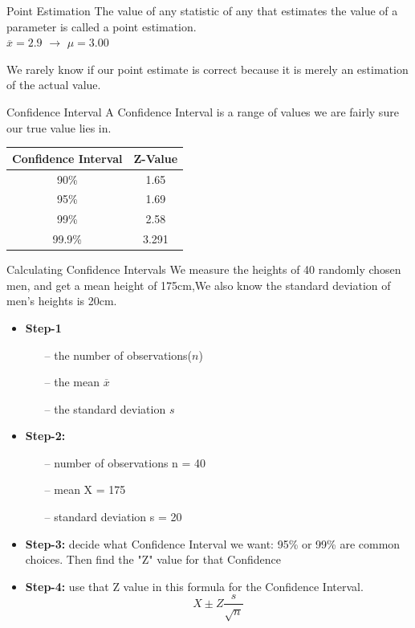 \begin{frame}[t]{Point Estimation}
	The value of any statistic of any that estimates the value of a parameter 
	is called a point estimation. \\ 
	$\overline{x} = 2.9$ $\rightarrow$ $\mu = 3.00$
	
	We rarely know if our point estimate is correct because it is merely an 
	estimation of the actual value.
\end{frame}


\begin{frame}[t]{Confidence Interval}
	A Confidence Interval is a range of values we are fairly sure our true 
	value lies in. \\ 
	\begin{center}
		\begin{tabular}{|c|c|}
			\hline 
			Confidence Interval & Z-Value \\ 
			\hline 
			90\% & 1.65 \\ 
			\hline 
			95\% & 1.69 \\ 
			\hline 
			99\% & 2.58 \\ 
			\hline 
			99.9\% & 3.291 \\ 
			\hline 
		\end{tabular}
	\end{center}
\end{frame}

\begin{frame}[t]{Calculating Confidence Intervals}
	We measure the heights of 40 randomly chosen men, and get a mean height of 
	175cm,We also know the standard deviation of men's heights is 20cm.
	
	\begin{itemize}
		\item \textbf{Step-1}
		\begin{itemize}
			\item[--]  the number of observations($n$)
			\item[--]  the mean $\overline{x}$
			\item[--] the standard deviation $s$
		\end{itemize}
		\item \textbf{Step-2:}
			\begin{itemize}
			\item[--]  number of observations n = 40
			\item[--]  mean X = 175
			\item[--]  standard deviation s = 20
		\end{itemize}
		\item \textbf{Step-3:} decide what Confidence Interval we want: 95\% or 
		99\% are common choices. Then find the "Z" value for that Confidence 
		\item \textbf{Step-4:} use that Z value in this formula for the 
		Confidence Interval.
		$$
		X \pm Z\frac{s}{\sqrt{n}}
		$$
	\end{itemize}
\end{frame}

